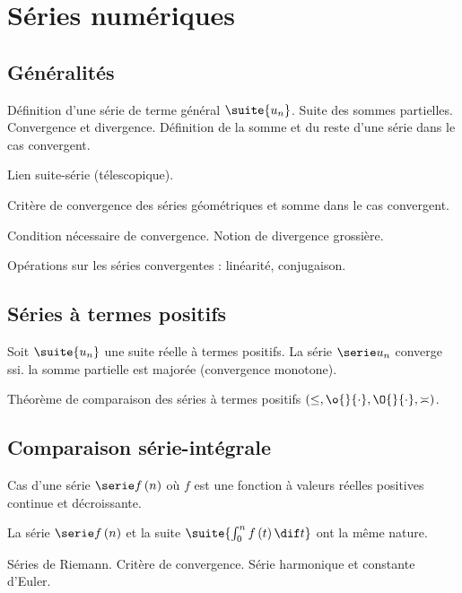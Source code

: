 \documentclass[a4paper,french,bookmarks]{article}
\begin{document}

\section*{Séries numériques}

\subsection*{Généralités}

\begin{enumerate}
    \ithand Définition d'une série de terme général $\suite{u_n}$. Suite des sommes partielles. Convergence et divergence. Définition de la somme et du reste d'une série dans le cas convergent.
    
    \ithand Lien suite-série (télescopique).
    
    \ithand Critère de convergence des séries géométriques et somme dans le cas convergent.
    
    \ithand Condition nécessaire de convergence. Notion de divergence grossière.

    \ithand Opérations sur les séries convergentes : linéarité, conjugaison.
\end{enumerate}

\subsection*{Séries à termes positifs}

\begin{enumerate}
    \ithand Soit $\suite{u_n}$ une suite réelle à termes positifs. La série $\serie u_n$ converge ssi. la somme partielle est majorée (convergence monotone).
    
    \ithand Théorème de comparaison des séries à termes positifs $(\leq , \o{}{\cdot}, \O{}{\cdot}, \asymp)$.
\end{enumerate}

\subsection*{Comparaison série-intégrale}

\begin{enumerate}
    \ithand Cas d'une série $\serie f\left(n\right)$ où $f$ est une fonction à valeurs réelles positives continue et décroissante.
    
    \ithand La série $\serie f\left(n\right)$ et la suite $\suite{\int_0^nf\left(t\right)\dif t}$ ont la même nature.
    
    \ithand Séries de Riemann. Critère de convergence. Série harmonique et constante d'Euler.
\end{enumerate}
\end{document}
